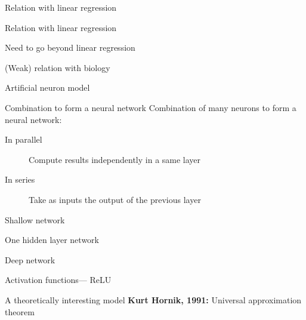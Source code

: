\begin{frame}{Relation with linear regression}
\end{frame}

\begin{frame}{Relation with linear regression}
\end{frame}

\begin{frame}{Need to go beyond linear regression}
\end{frame}

\begin{frame}{(Weak) relation with biology}
\end{frame}

\begin{frame}{Artificial neuron model}
\end{frame}

\begin{frame}{Combination to form a neural network}
  Combination of many neurons to form a neural network:
  \begin{description}
    \item[In parallel] Compute results independently in a same layer
    \item[In series] Take as inputs the output of the previous layer
  \end{description}
\end{frame}

\begin{frame}{Shallow network}
  \centering
\end{frame}

\begin{frame}{One hidden layer network}
  \centering
\end{frame}

\begin{frame}{Deep network}
  \centering
\end{frame}

\begin{frame}{Activation functions--- ReLU}
  \begin{center}
  \end{center}

\end{frame}

\begin{frame}{A theoretically interesting model}
  \textbf{Kurt Hornik, 1991:} Universal approximation theorem

\end{frame}
